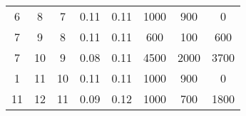 \begin{table}[]
\begin{tabular}{@{}cccccccc@{}}
6                                                           & 8                                                             & 7                                                    & 0.11                                                                            & 0.11                                                                           & 1000                                                                            & 900                                                                                 & 0                                                                    \\
7                                                           & 9                                                             & 8                                                    & 0.11                                                                            & 0.11                                                                           & 600                                                                             & 100                                                                                 & 600                                                                  \\
7                                                           & 10                                                            & 9                                                    & 0.08                                                                            & 0.11                                                                           & 4500                                                                            & 2000                                                                                & 3700                                                                 \\
1                                                           & 11                                                            & 10                                                   & 0.11                                                                            & 0.11                                                                           & 1000                                                                            & 900                                                                                 & 0                                                                    \\
11                                                          & 12                                                            & 11                                                   & 0.09                                                                            & 0.12                                                                           & 1000                                                                            & 700                                                                                 & 1800                                                                 \\

\end{tabular}
\end{table}
